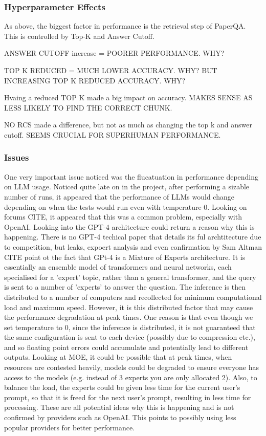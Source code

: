 \subsubsection{Hyperparameter Effects}
As above, the biggest factor in performance is the retrieval step of PaperQA.
This is controlled by Top-K and Answer Cutoff.

ANSWER CUTOFF increase = POORER PERFORMANCE. WHY? 

TOP K REDUCED = MUCH LOWER ACCURACY. WHY? BUT INCREASING TOP K REDUCED ACCURACY. WHY?

Hvaing a reduced TOP K made a big impact on accuracy. MAKES SENSE AS LESS LIKELY TO FIND THE CORRECT CHUNK. 

NO RCS made a difference, but not as much as changing the top k and answer cutoff. SEEMS CRUCIAL FOR SUPERHUMAN PERFORMANCE. 

\subsubsection{Issues}
One very important issue noticed was the flucatuation in performance depending on LLM usage.
Noticed quite late on in the project, after performing a sizable number of runs, it appeared that the performance of LLMs would change depending on when the tests would run even with temperature 0. Looking on forums CITE, it appeared that this was a common problem, especially with OpenAI. Looking into the GPT-4 architecture could return a reason why this is happening. There is no GPT-4 techical paper that details its ful archtitecture due to competition, but leaks, expoert analysis and even confirmation by Sam Altman CITE point ot the fact that GPt-4 is a Mixture of Experts architecture. It is essentially an ensemble model of transformers and neural networks, each specialised for a 'expert' topic, rather than a general transformer, and the query is sent to a number of 'experts' to answer the question. The inference is then distributed to a number of computers and recollected for minimum computational load and maximum speed. However, it is this distributed factor that may cause the performance degradation at peak times. One reason is that even though we set temperature to 0, since the inference is distributed, it is not guaranteed that the same configuration is sent to each device (possibly due to compression etc.), and so floating point errors could accumulate and potentially lead to different outputs. Looking at MOE, it could be possible that at peak times, when resources are contested heavily, models could be degraded to ensure everyone has access to the models (e.g. instead of 3 experts you are only allocated 2). Also, to balance the load, the experts could be given less time for the current user's prompt, so that it is freed for the next user's prompt, resulting in less time for processing. These are all potential ideas why this is happening and is not confirmed by providers such as OpenAI. This points to possibly using less popular providers for better performance. 

